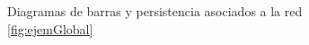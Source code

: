 \documentclass[12pt, a4paper, twoside]{book}
\numberwithin{equation}{section}
\theoremstyle{definition}
\newenvironment{ejem}
  {\pushQED{\qed}\renewcommand{\qedsymbol}{$\blacktriangleleft$}\ejemplo}
  {\popQED\endejemplo}
\theoremstyle{remark}
\theoremstyle{plain}
\begin{document}
\begin{ejem}
	\begin{figure}[!htbp]
			\begin{figure}[H]
			\end{figure}
		\endminipage
			\begin{figure}[H]
			\end{figure}
		\endminipage
		\caption{Diagramas de barras y persistencia asociados a la red 
		\ref{fig:ejemGlobal}}
		\label{fig:ejemGlobalDiag}
	\end{figure}
	

\end{ejem}
\end{document}
